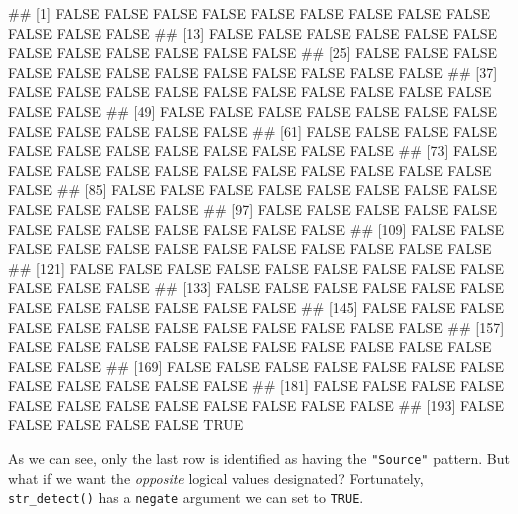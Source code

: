 \documentclass[11pt,]{article}
\newenvironment{Shaded}{\begin{snugshade}}{\end{snugshade}}
\newcommand{\AttributeTok}[1]{\textcolor[rgb]{0.77,0.63,0.00}{#1}}
\newcommand{\ConstantTok}[1]{\textcolor[rgb]{0.00,0.00,0.00}{#1}}
\newcommand{\FunctionTok}[1]{\textcolor[rgb]{0.00,0.00,0.00}{#1}}
\newcommand{\NormalTok}[1]{#1}
\newcommand{\SpecialCharTok}[1]{\textcolor[rgb]{0.00,0.00,0.00}{#1}}
\newcommand{\StringTok}[1]{\textcolor[rgb]{0.31,0.60,0.02}{#1}}
\let\oldShaded\Shaded
\let\endoldShaded\endShaded
\renewenvironment{Shaded}{\footnotesize\oldShaded}{\endoldShaded}
\let\oldverbatim\verbatim
\let\endoldverbatim\endverbatim
\renewenvironment{verbatim}{\footnotesize\oldverbatim}{\endoldverbatim}
\begin{document}
\begin{verbatim}
##   [1] FALSE FALSE FALSE FALSE FALSE FALSE FALSE FALSE FALSE FALSE FALSE FALSE
##  [13] FALSE FALSE FALSE FALSE FALSE FALSE FALSE FALSE FALSE FALSE FALSE FALSE
##  [25] FALSE FALSE FALSE FALSE FALSE FALSE FALSE FALSE FALSE FALSE FALSE FALSE
##  [37] FALSE FALSE FALSE FALSE FALSE FALSE FALSE FALSE FALSE FALSE FALSE FALSE
##  [49] FALSE FALSE FALSE FALSE FALSE FALSE FALSE FALSE FALSE FALSE FALSE FALSE
##  [61] FALSE FALSE FALSE FALSE FALSE FALSE FALSE FALSE FALSE FALSE FALSE FALSE
##  [73] FALSE FALSE FALSE FALSE FALSE FALSE FALSE FALSE FALSE FALSE FALSE FALSE
##  [85] FALSE FALSE FALSE FALSE FALSE FALSE FALSE FALSE FALSE FALSE FALSE FALSE
##  [97] FALSE FALSE FALSE FALSE FALSE FALSE FALSE FALSE FALSE FALSE FALSE FALSE
## [109] FALSE FALSE FALSE FALSE FALSE FALSE FALSE FALSE FALSE FALSE FALSE FALSE
## [121] FALSE FALSE FALSE FALSE FALSE FALSE FALSE FALSE FALSE FALSE FALSE FALSE
## [133] FALSE FALSE FALSE FALSE FALSE FALSE FALSE FALSE FALSE FALSE FALSE FALSE
## [145] FALSE FALSE FALSE FALSE FALSE FALSE FALSE FALSE FALSE FALSE FALSE FALSE
## [157] FALSE FALSE FALSE FALSE FALSE FALSE FALSE FALSE FALSE FALSE FALSE FALSE
## [169] FALSE FALSE FALSE FALSE FALSE FALSE FALSE FALSE FALSE FALSE FALSE FALSE
## [181] FALSE FALSE FALSE FALSE FALSE FALSE FALSE FALSE FALSE FALSE FALSE FALSE
## [193] FALSE FALSE FALSE FALSE FALSE  TRUE
\end{verbatim}

As we can see, only the last row is identified as having the
\texttt{"Source"} pattern. But what if we want the \emph{opposite}
logical values designated? Fortunately, \texttt{str\_detect()} has a
\texttt{negate} argument we can set to \texttt{TRUE}.

\begin{Shaded}
\end{Shaded}
\end{document}
